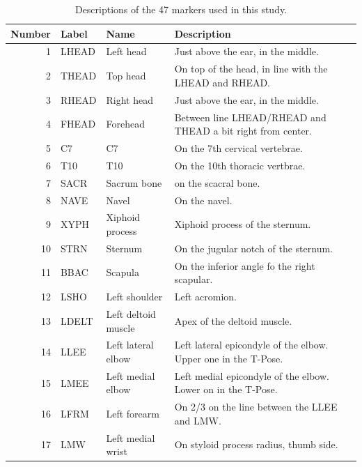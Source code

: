 \documentclass{article}
\begin{document}
\begin{table}
  \caption{Descriptions of the 47 markers used in this study.}
  \centering
  \small
  \begin{tabular}{rlll}
    \toprule
    Number & Label & Name & Description \\
    \midrule
    1  & LHEAD & Left head                             & Just above the ear, in the middle. \\
    2  & THEAD & Top head                              & On top of the head, in line with the LHEAD and RHEAD. \\
    3  & RHEAD & Right head                            & Just above the ear, in the middle. \\
    4  & FHEAD & Forehead                              & Between line LHEAD/RHEAD and THEAD a bit right from center. \\
    5  & C7    & C7                                    & On the 7th cervical vertebrae. \\
    6  & T10   & T10                                   & On the 10th thoracic vertbrae. \\
    7  & SACR  & Sacrum bone                           & on the scacral bone. \\
    8  & NAVE  & Navel                                 & On the navel. \\
    9  & XYPH  & Xiphoid process                       & Xiphoid process of the sternum. \\
    10 & STRN  & Sternum                               & On the jugular notch of the sternum. \\
    11 & BBAC  & Scapula                               & On the inferior angle fo the right scapular. \\
    12 & LSHO  & Left shoulder                         & Left acromion. \\
    13 & LDELT & Left deltoid muscle                   & Apex of the deltoid muscle. \\
    14 & LLEE  & Left lateral elbow                    & Left lateral epicondyle of the elbow. Upper one in the T-Pose. \\
    15 & LMEE  & Left medial elbow                     & Left medial epicondyle of the elbow. Lower on in the T-Pose. \\
    16 & LFRM  & Left forearm                          & On 2/3 on the line between the LLEE and LMW. \\
    17 & LMW   & Left medial wrist                     & On styloid process radius, thumb side. \\

\end{tabular}
\end{table}
\end{document}
